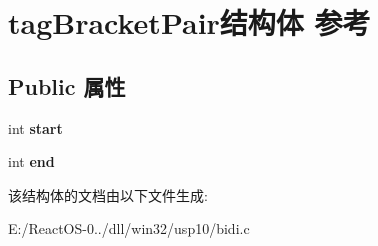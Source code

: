 \hypertarget{structtag_bracket_pair}{}\section{tag\+Bracket\+Pair结构体 参考}
\label{structtag_bracket_pair}
\subsection*{Public 属性}
\begin{DoxyCompactItemize}
\item 
\mbox{\label{structtag_bracket_pair_af442edf18d0a52201da117da5306eb5e}} 
int {\bfseries start}
\item 
\mbox{\label{structtag_bracket_pair_a133a38c23397e49976a2758c69093cc6}} 
int {\bfseries end}
\end{DoxyCompactItemize}


该结构体的文档由以下文件生成\+:\begin{DoxyCompactItemize}
\item 
E\+:/\+React\+O\+S-\/0../dll/win32/usp10/bidi.\+c\end{DoxyCompactItemize}
